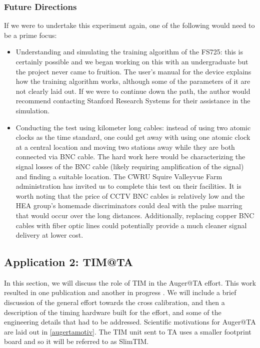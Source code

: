 \subsubsection{Future Directions}
\label{futdir}
If we were to undertake this experiment again, one of the following would need to be a prime focus:
\begin{itemize}
	\item Understanding and simulating the training algorithm of the FS725: this is certainly possible and we began working on this with an undergraduate but the project never came to fruition. The user's manual for the device explains how the training algorithm works, although some of the parameters of it are not clearly laid out. If we were to continue down the path, the author would recommend contacting Stanford Research Systems for their assistance in the simulation.
	\item Conducting the test using kilometer long cables: instead of using two atomic clocks as the time standard, one could get away with using one atomic clock at a central location and moving two stations away while they are both connected via BNC cable. The hard work here would be characterizing the signal losses of the BNC cable (likely requiring amplification of the signal) and finding a suitable location. The CWRU Squire Valleyvue Farm administration has invited us to complete this test on their facilities. It is worth noting that the price of CCTV BNC cables is relatively low and the HEA group's homemade discriminators could deal with the pulse marring that would occur over the long distances. Additionally, replacing copper BNC cables with fiber optic lines could potentially provide a much cleaner signal delivery at lower cost.
\end{itemize}

\subsection{Application 2: TIM@TA}

\label{augeratta}
In this section, we will discuss the role of TIM in the Auger@TA effort. This work resulted in one publication and another in progress \cite{augerta1}. We will include a brief discussion of the general effort towards the cross calibration, and then a description of the timing hardware built for the effort, and some of the engineering details that had to be addressed. Scientific motivations for Auger@TA are laid out in \autoref{augertamotiv}. The TIM unit sent to TA uses a smaller footprint board and so it will be referred to as SlimTIM. 

